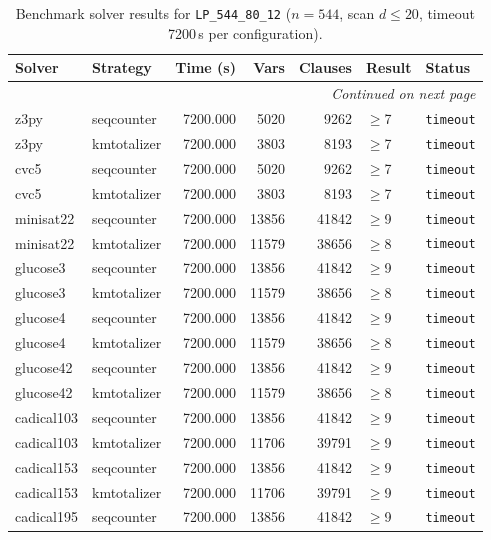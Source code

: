 \begin{longtable}{llrrrl p{}}
\caption{Benchmark solver results for \texttt{LP\_544\_80\_12} ($n=544$, scan $d \leq 20$, timeout 7200\,s per configuration).} \label{tab:bench-LP_544_80_12} \\
\toprule
Solver & Strategy & Time (s) & Vars & Clauses & Result & Status \\
\midrule
\endhead
\midrule
\multicolumn{7}{r}{\textit{Continued on next page}} \\
\midrule
\endfoot
\bottomrule
\endlastfoot
z3py & seqcounter & 7200.000 & 5020 & 9262 & $\geq$7 & \texttt{timeout} \\
z3py & kmtotalizer & 7200.000 & 3803 & 8193 & $\geq$7 & \texttt{timeout} \\
cvc5 & seqcounter & 7200.000 & 5020 & 9262 & $\geq$7 & \texttt{timeout} \\
cvc5 & kmtotalizer & 7200.000 & 3803 & 8193 & $\geq$7 & \texttt{timeout} \\
minisat22 & seqcounter & 7200.000 & 13856 & 41842 & $\geq$9 & \texttt{timeout} \\
minisat22 & kmtotalizer & 7200.000 & 11579 & 38656 & $\geq$8 & \texttt{timeout} \\
glucose3 & seqcounter & 7200.000 & 13856 & 41842 & $\geq$9 & \texttt{timeout} \\
glucose3 & kmtotalizer & 7200.000 & 11579 & 38656 & $\geq$8 & \texttt{timeout} \\
glucose4 & seqcounter & 7200.000 & 13856 & 41842 & $\geq$9 & \texttt{timeout} \\
glucose4 & kmtotalizer & 7200.000 & 11579 & 38656 & $\geq$8 & \texttt{timeout} \\
glucose42 & seqcounter & 7200.000 & 13856 & 41842 & $\geq$9 & \texttt{timeout} \\
glucose42 & kmtotalizer & 7200.000 & 11579 & 38656 & $\geq$8 & \texttt{timeout} \\
cadical103 & seqcounter & 7200.000 & 13856 & 41842 & $\geq$9 & \texttt{timeout} \\
cadical103 & kmtotalizer & 7200.000 & 11706 & 39791 & $\geq$9 & \texttt{timeout} \\
cadical153 & seqcounter & 7200.000 & 13856 & 41842 & $\geq$9 & \texttt{timeout} \\
cadical153 & kmtotalizer & 7200.000 & 11706 & 39791 & $\geq$9 & \texttt{timeout} \\
cadical195 & seqcounter & 7200.000 & 13856 & 41842 & $\geq$9 & \texttt{timeout} \\

\end{longtable}

